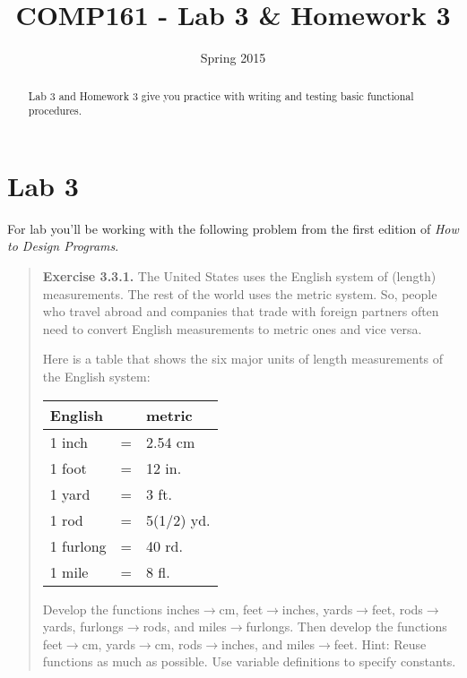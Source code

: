 \documentclass[]{tufte-handout}
\title{COMP161 - Lab 3 \& Homework 3}
\author{}
\date{Spring 2015}
\begin{document}
\maketitle

\begin{abstract}
Lab 3 and Homework 3 give you practice with writing and testing basic functional procedures.  
\end{abstract}

\section{Lab 3}

For lab you'll be working with the following problem from the first edition of \textit{How to Design Programs}.
\begin{framed}
\begin{quote}
\textbf{Exercise 3.3.1.}   The United States uses the English system of (length) measurements. The rest of the world uses the metric system. So, people who travel abroad and companies that trade with foreign partners often need to convert English measurements to metric ones and vice versa.

Here is a table that shows the six major units of length measurements of the English system:


\begin{center}
\begin{tabular}{lcl}
English & &  metric \\ \hline
1 inch	&=&	2.54	cm \\
1 foot	&=&	12	in. \\
1 yard	&=&	3	ft. \\
1 rod	&=&	5(1/2)	yd.\\
1 furlong	&=&	40	rd.\\
1 mile	&=&	8	fl.
\end{tabular}
\end{center}

Develop the functions inches$\rightarrow$cm, feet$\rightarrow$inches, yards$\rightarrow$feet, rods$\rightarrow$yards, furlongs$\rightarrow$rods, and miles$\rightarrow$furlongs.
Then develop the functions feet$\rightarrow$cm, yards$\rightarrow$cm, rods$\rightarrow$inches, and miles$\rightarrow$feet.
Hint: Reuse functions as much as possible. Use variable definitions to specify constants.
\end{quote}
\end{framed}
\end{document}
